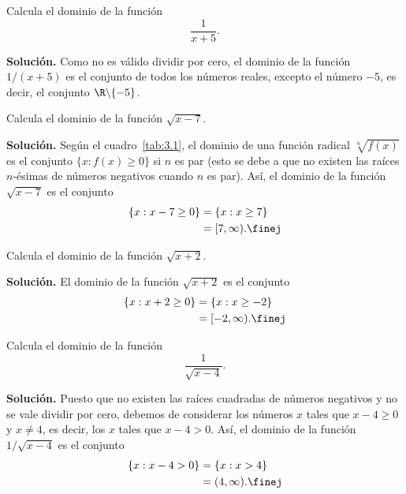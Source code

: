 \documentclass[12pt,a4paper]{book}
\begin{document}
    \begin{ejemplo}\label{ejm:11}
        Calcula el dominio de la función
        \begin{equation*}
            \frac{1}{x+5}.
        \end{equation*}

        \textbf{Solución.} Como no es válido dividir por cero, el dominio de la función
        $1/(x+5)$ es el conjunto de todos los números reales, excepto el número $-5$,
        es decir, el conjunto $\R\backslash\{-5\}$.
    \end{ejemplo}

    \begin{ejemplo}\label{ejm:12}
        Calcula el dominio de la función $\sqrt{x-7}$.

        \textbf{Solución.} Según el cuadro~\ref{tab:3.1}, el dominio de una función radical $\sqrt[n]{f(x)}$
        es el conjunto $\{x:f(x)\geq 0\}$ si $n$ es par (esto se debe a que no existen las
        raíces $n$-ésimas de números negativos cuando $n$ es par). Así, el dominio de la
        función $\sqrt{x-7}$ es el conjunto
        \begin{align*}
            \{x:x-7\geq 0\}&=\{x:x\geq 7\}\\
            &=[7,\infty).\finej
        \end{align*}
    \end{ejemplo}

    \begin{ejemplo}\label{ejm:13}
        Calcula el dominio de la función $\sqrt{x+2}$.

        \textbf{Solución.} El dominio de la función $\sqrt{x+2}$ es el conjunto
        \begin{align*}
            \{x:x+2\geq 0\}&=\{x:x\geq -2\}\\
            &=[-2,\infty).\finej
        \end{align*}
    \end{ejemplo}

    \begin{ejemplo}\label{ejm:14}
        Calcula el dominio de la función
        \begin{equation*}
            \frac{1}{\sqrt{x-4}}.
        \end{equation*}

        \textbf{Solución.} Puesto que no existen las raíces cuadradas de números negativos
        y no se vale dividir por cero, debemos de considerar los números $x$ tales que
        $x-4\geq 0$ y $x\neq 4$, es decir, los $x$ tales que $x-4>0$. Así, el dominio de la
        función $1/\sqrt{x-4}$ es el conjunto
        \begin{align*}
            \{x:x-4>0\}&=\{x:x>4\}\\
            &=(4,\infty).\finej
        \end{align*}
    \end{ejemplo}
\end{document}
